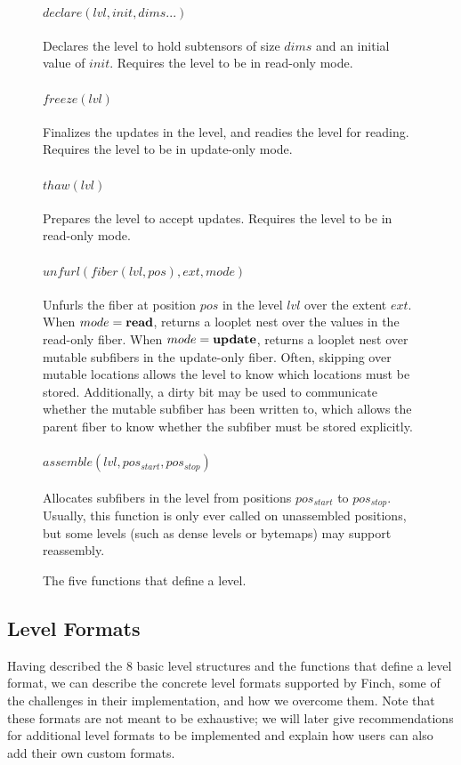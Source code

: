 \begin{figure}
    \raggedright
\paragraph{$declare(lvl, init, dims...)$} Declares the level to hold subtensors
of size $dims$ and an initial value of $init$. Requires the level to be in
read-only mode.
\paragraph{$freeze(lvl)$} Finalizes the updates in the level, and readies the
level for reading. Requires the level to be in update-only mode.
\paragraph{$thaw(lvl)$} Prepares the level to accept updates. Requires the level
to be in read-only mode.
\paragraph{$unfurl(fiber(lvl, pos), ext, mode)$} Unfurls the fiber at position
$pos$ in the level $lvl$ over the extent $ext$. When $mode = \text{\textbf{read}}$,
returns a looplet nest over the values in the read-only fiber.  When $mode =
\text{\textbf{update}}$, returns a looplet nest over mutable subfibers in the update-only
fiber. Often, skipping over mutable locations allows the level to know which
locations must be stored. Additionally, a dirty bit may be used to communicate
whether the mutable subfiber has been written to, which allows the parent fiber
to know whether the subfiber must be stored explicitly.
\paragraph{$assemble(lvl, pos_{start}, pos_{stop})$} Allocates subfibers in the
level from positions $pos_{start}$ to $pos_{stop}$. Usually, this function is
only ever called on unassembled positions, but some levels (such as dense levels
or bytemaps) may support reassembly.
\caption{The five functions that define a level.}
\end{figure}

\subsection{Level Formats}
Having described the 8 basic level structures and the functions that define a
level format, we can describe the concrete level formats supported by Finch,
some of the challenges in their implementation, and how we overcome them. Note
that these formats are not meant to be exhaustive; we will later give
recommendations for additional level formats to be implemented and explain how
users can also add their own custom formats.

